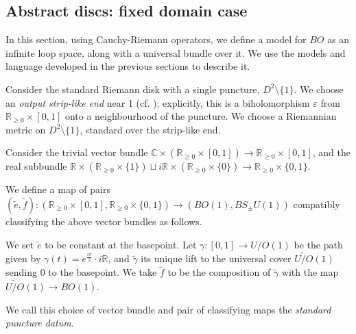 \documentclass{TPmod}
\def\bC{\mathbb{C}}
\def\bR{\mathbb{R}}
\newcommand{\eps}{\varepsilon}
\numberwithin{equation}{section}
\begin{document}
\subsection{Abstract discs: fixed domain case}\label{sec:abst disc fix case}
    In this section, using Cauchy-Riemann operators, we define a model for $BO$ as an infinite loop space, along with a universal bundle over it. We use the models and language developed in the previous sections to describe it. 

    Consider the standard Riemann disk with a single puncture, $D^2 \setminus \{1\}$. We choose an \emph{output strip-like end} near 1 (cf. \cite[Section 7.3]{PS}); explicitly, this is a biholomorphism $\eps$ from $\bR_{\geq 0} \times [0,1]$ onto a neighbourhood of the puncture. We choose a Riemannian metric on $D^2 \setminus \{1\}$, standard over the strip-like end.
    \begin{defn}\label{def: std pun data}
        Consider the trivial vector bundle $\bC \times (\bR_{\geq 0} \times [0,1]) \to \bR_{\geq 0} \times [0,1]$, and the real subbundle $\bR \times (\bR_{\geq 0} \times \{1\}) \sqcup i\bR \times (\bR_{\geq 0} \times \{0\}) \to \bR_{\geq 0} \times \{0, 1\}$.

    
        We define a map of pairs $(\widetilde e, \widetilde f): (\bR_{\geq 0} \times [0,1], \bR_{\geq 0} \times \{0,1\}) \to (BO(1), BS_\pm U(1))$ compatibly classifying the above vector bundles as follows. 
        
        We set $\widetilde e$ to be constant at the basepoint. Let $\gamma: [0,1] \to {U/O}(1)$ be the path given by $\gamma(t) = e^{\frac{i\pi}2} \cdot i\bR$, and $\widetilde{\gamma}$ its unique lift to the universal cover $\widetilde{U/O}(1)$ sending $0$ to the basepoint. We take $\widetilde f$ to be the composition of $\widetilde \gamma$ with the map $\widetilde{U/O}(1) \to BO(1)$.

        We call this choice of vector bundle and pair of classifying maps the \emph{standard puncture datum}.
    \end{defn}
\end{document}
